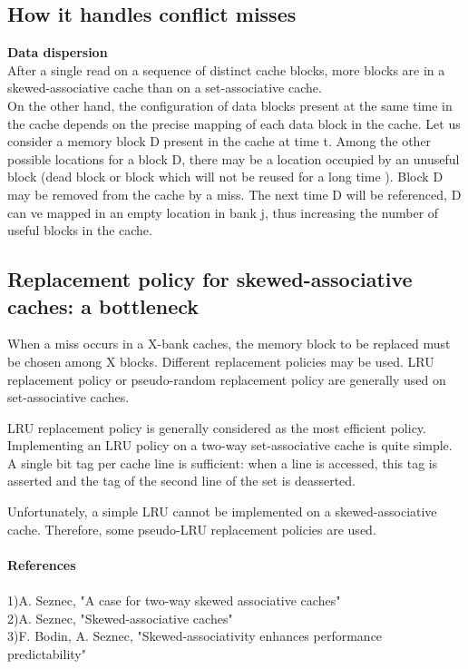 \documentclass{article}
\begin{document}
\begin{large}
\subsection{How it handles conflict misses}
\textbf{Data dispersion}\\After a single read on a sequence of distinct cache blocks, more blocks are in a skewed-associative cache than on a set-associative cache.\\
\qquad On the other hand, the configuration of data blocks present at the same time in the cache depends on the precise mapping of each data block in the cache. Let us consider a memory block D present in the cache at time t. Among the other possible locations for a block D, there may be a location occupied by an unuseful block (dead block or block which will not be reused for a long time ). Block D may be removed from the cache by a miss. The next time D will be referenced, D can ve mapped in an empty location in bank j, thus increasing the number of useful blocks in the cache. 

\subsection{Replacement policy for skewed-associative caches: a bottleneck}
When a miss occurs in a X-bank caches, the memory block
to be replaced must be chosen among X blocks. Different replacement policies may be used. LRU replacement policy or pseudo-random replacement policy are generally used on set-associative caches.

\qquad LRU replacement policy is generally considered as the most efficient policy. Implementing an LRU policy on a two-way set-associative cache is quite simple. A single bit tag per cache line is sufficient: when a line is accessed, this tag is asserted and the tag of the second line of the set is deasserted.

\qquad Unfortunately, a simple LRU cannot be implemented on a skewed-associative cache. Therefore, some pseudo-LRU replacement policies are used.
\newline\\\\
\textbf{References}\\\\
1)A. Seznec, "A case for two-way skewed associative caches"\\
2)A. Seznec, "Skewed-associative caches"\\
3)F. Bodin, A. Seznec, "Skewed-associativity enhances performance predictability"

\end{large}
\end{document}
